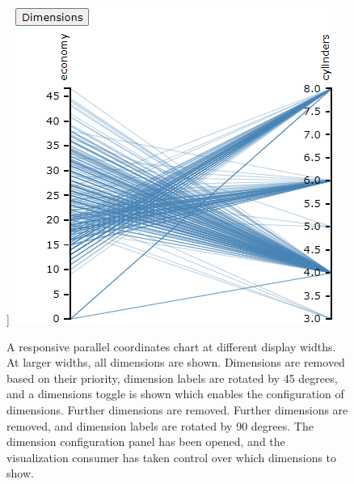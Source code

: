 \begin{figure}[tp]
]
{%
\includegraphics[valign=b,scale=\respparcoordscale]
{images/resp-parcoord-4.png}%
\label{fig:RespParCoordExample4}%
}
\hfill
{}
\caption[Responsive Parallel Coordinates Chart Example]
{ A responsive parallel coordinates chart at different display widths.
 At larger widths, all dimensions are
shown.  Dimensions are removed based
on their priority, dimension labels are rotated by 45 degrees, and a
dimensions toggle is shown which enables the configuration of
dimensions.  Further dimensions are
removed.  Further dimensions are
removed, and dimension labels are rotated by 90 degrees.
 The dimension configuration panel
has been opened, and the visualization consumer has taken control over
which dimensions to show.  }
\label{fig:RespParCoordExample}
\end{figure}

